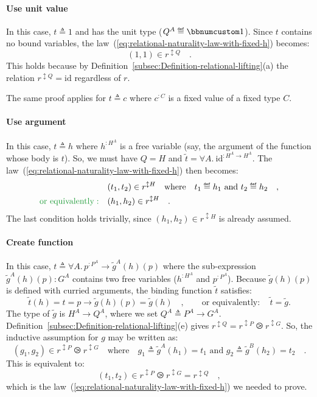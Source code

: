 \paragraph{Use unit value}

In this case, $t\triangleq1$ and has the unit type ($Q^{A}\triangleq\bbnum 1$).
Since $t$ contains no bound variables, the law~(\ref{eq:relational-naturality-law-with-fixed-h})
becomes:
\[
(1,1)\in r^{\updownarrow Q}\quad.
\]
This holds because by Definition~\ref{subsec:Definition-relational-lifting}(a)
the relation $r^{\updownarrow Q}=\text{id}$ regardless of $r$.

The same proof applies for $t\triangleq c$ where $c^{:C}$ is a fixed
value of a fixed type $C$.

\paragraph{Use argument}

In this case, $t\triangleq h$ where $h^{:H^{A}}$ is a free variable
(say, the argument of the function whose body is $t$). So, we must
have $Q=H$ and $\tilde{t}=\forall A.\:\text{id}^{:H^{A}\rightarrow H^{A}}$.
The law~(\ref{eq:relational-naturality-law-with-fixed-h}) then becomes:
\begin{align*}
 & (t_{1},t_{2})\in r^{\updownarrow H}\quad\text{where}\quad t_{1}\triangleq h_{1}\text{ and }t_{2}\triangleq h_{2}\quad,\\
{\color{greenunder}\text{or equivalently}:}\quad & (h_{1},h_{2})\in r^{\updownarrow H}\quad.
\end{align*}
The last condition holds trivially, since $(h_{1},h_{2})\in r^{\updownarrow H}$
is already assumed.

\paragraph{Create function}

In this case, $t\triangleq\forall A.\,p^{:P^{A}}\rightarrow\tilde{g}^{A}(h)(p)$
where the sub-expression $\tilde{g}^{A}(h)(p):G^{A}$ contains two
free variables ($h^{:H^{A}}$ and $p^{:P^{A}}$). Because $\tilde{g}(h)(p)$
is defined with curried arguments, the binding function $\tilde{t}$
satisfies:
\[
\tilde{t}(h)=t=p\rightarrow\tilde{g}(h)(p)=\tilde{g}(h)\quad,\quad\quad\text{or equivalently}:\quad\tilde{t}=\tilde{g}.
\]
The type of $\tilde{g}$ is $H^{A}\rightarrow Q^{A}$, where we set
$Q^{A}\triangleq P^{A}\rightarrow G^{A}$. Definition~\ref{subsec:Definition-relational-lifting}(e)
gives $r^{\updownarrow Q}=r^{\updownarrow P}\ogreaterthan r^{\updownarrow G}$.
So, the inductive assumption for $g$ may be written as:
\[
(g_{1},g_{2})\in r^{\updownarrow P}\ogreaterthan r^{\updownarrow G}\quad\text{where}\quad g_{1}\triangleq\tilde{g}^{A}(h_{1})=t_{1}\text{ and }g_{2}\triangleq\tilde{g}^{B}(h_{2})=t_{2}\quad.
\]
This is equivalent to:
\[
(t_{1},t_{2})\in r^{\updownarrow P}\ogreaterthan r^{\updownarrow G}=r^{\updownarrow Q}\quad,
\]
which is the law~(\ref{eq:relational-naturality-law-with-fixed-h})
we needed to prove.

